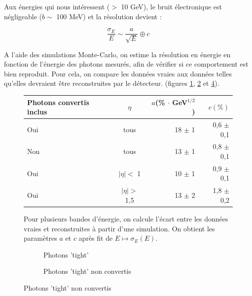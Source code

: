 \documentclass[11pt]{article} %
\begin{document}
Aux énergies qui nous intéressent ($>$ 10 GeV), le bruit électronique est négligeable ($b \sim$ 100 MeV) et la résolution devient :

\begin{equation}
\dfrac{\sigma_E}{E} \sim \dfrac{a}{\sqrt{E}} \oplus c
\end{equation}

A l'aide des simulations Monte-Carlo, on estime la résolution en énergie en fonction de l'énergie des photons mesurés, afin de vérifier si ce comportement est bien reproduit. Pour cela, on compare les données vraies aux données telles qu'elles devraient être reconstruites par le détecteur. (figures \ref{fig:resolution_energie_photons_tab}, \ref{fig:resolution_energie_photons} et \ref{fig:resolution_energie_photons2}).

\begin{figure}[H]
\centering
\begin{tabular}{|l|c|r|r|} 
   \hline
   Photons convertis inclus &$\eta$ & $a$(\% $\cdot$ GeV${ }^{1/2}$) & $c (\%)$ \\
    \hline
   Oui & tous & 18  $\pm$ 1  &0,6  $\pm$ 0,1  \\
  \hline
   Non & tous & 13  $\pm$ 1  &0,8  $\pm$ 0,1  \\
  \hline
   Oui &$|\eta| < $ 1 & 10  $\pm$ 1  &0,9  $\pm$ 0,1  \\
\hline
   Oui & $|\eta| >$ 1,5 & 13  $\pm$ 2  &1,8  $\pm$ 0,2  \\
\hline
\end{tabular}
\caption{ Pour plusieurs bandes d'énergie, on calcule l'écart entre les données vraies et reconstruites à partir d'une simulation. On obtient les paramètres $a$ et $c$ après fit de $E \mapsto \sigma_E(E)$.  }
\label{fig:resolution_energie_photons_tab} 
\end{figure}

\begin{figure}[H]
\begin{subfigure}[b]{.5\linewidth}
\centering
  \caption{Photons 'tight' }
\label{fig:resolution_energie_photons} 
 \resizebox{1.1\linewidth}{!}{}
\end{subfigure}
\begin{subfigure}[b]{.5\linewidth}
\centering
  \caption{Photons 'tight' non convertis} 
\label{fig:resolution_energie_photons2} 
 \resizebox{1.1\linewidth}{!}{}
\end{subfigure}
\end{figure}
\end{document}
